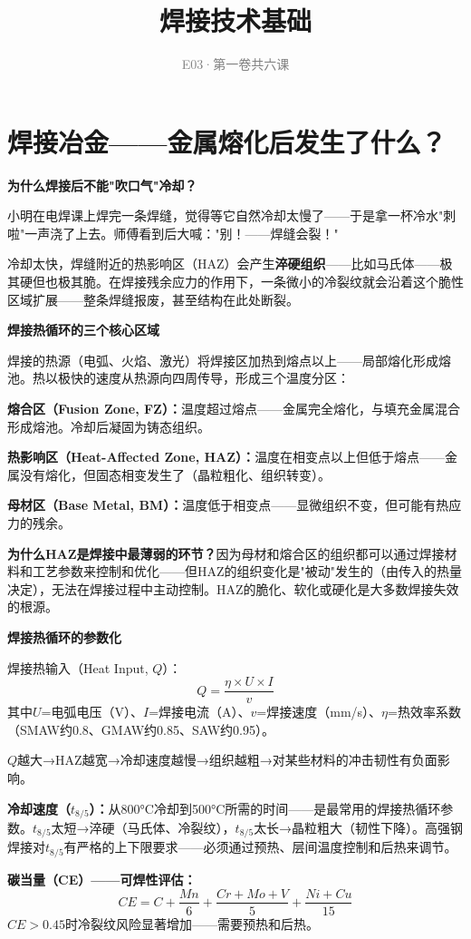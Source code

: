 \documentclass[a4paper,11pt]{ctexbook}
\title{\textcolor{themeblue}{\Huge\textbf{焊接技术基础}}}
\subtitle{\textcolor{gray}{E03·第一卷\quad 共六课}}
\date{}
\newenvironment{scenario}{\vspace{0.4cm}\noindent\begin{tcolorbox}[colback=scenario!5!white,colframe=scenario!70!black,title=\textcolor{scenario}{\textbf{情景引入}}]\vspace{0.1cm}}{\end{tcolorbox}\vspace{0.3cm}}
\newenvironment{qualitative}{\vspace{0.3cm}\noindent\begin{tcolorbox}[colback=themeblue!5!white,colframe=themeblue!60!black,title=\textcolor{themeblue}{\textbf{定性分析}}]\vspace{0.1cm}}{\end{tcolorbox}\vspace{0.3cm}}
\newenvironment{quantitative}{\vspace{0.3cm}\noindent\begin{tcolorbox}[colback=quant!5!white,colframe=quant!60!black,title=\textcolor{quant}{\textbf{定量分析}}]\vspace{0.1cm}}{\end{tcolorbox}\vspace{0.3cm}}
\begin{document}
\maketitle\thispagestyle{empty}\tableofcontents\newpage

\chapter{焊接冶金——金属熔化后发生了什么？}

\begin{scenario}
\textbf{为什么焊接后不能"吹口气"冷却？}

小明在电焊课上焊完一条焊缝，觉得等它自然冷却太慢了——于是拿一杯冷水"刺啦"一声浇了上去。师傅看到后大喊："别！——焊缝会裂！"

冷却太快，焊缝附近的热影响区（HAZ）会产生\textbf{淬硬组织}——比如马氏体——极其硬但也极其脆。在焊接残余应力的作用下，一条微小的冷裂纹就会沿着这个脆性区域扩展——整条焊缝报废，甚至结构在此处断裂。
\end{scenario}

\begin{qualitative}
\textbf{焊接热循环的三个核心区域}

焊接的热源（电弧、火焰、激光）将焊接区加热到熔点以上——局部熔化形成熔池。热以极快的速度从热源向四周传导，形成三个温度分区：

\textbf{熔合区（Fusion Zone, FZ）：}温度超过熔点——金属完全熔化，与填充金属混合形成熔池。冷却后凝固为铸态组织。

\textbf{热影响区（Heat-Affected Zone, HAZ）：}温度在相变点以上但低于熔点——金属没有熔化，但固态相变发生了（晶粒粗化、组织转变）。

\textbf{母材区（Base Metal, BM）：}温度低于相变点——显微组织不变，但可能有热应力的残余。

\textbf{为什么HAZ是焊接中最薄弱的环节？}因为母材和熔合区的组织都可以通过焊接材料和工艺参数来控制和优化——但HAZ的组织变化是"被动"发生的（由传入的热量决定），无法在焊接过程中主动控制。HAZ的脆化、软化或硬化是大多数焊接失效的根源。
\end{qualitative}

\begin{quantitative}
\textbf{焊接热循环的参数化}

焊接热输入（Heat Input, $Q$）：
\[
Q = \frac{\eta \times U \times I}{v}
\]
其中$U$=电弧电压（V）、$I$=焊接电流（A）、$v$=焊接速度（mm/s）、$\eta$=热效率系数（SMAW约0.8、GMAW约0.85、SAW约0.95）。

$Q$越大→HAZ越宽→冷却速度越慢→组织越粗→对某些材料的冲击韧性有负面影响。

\textbf{冷却速度（$t_{8/5}$）：}从800°C冷却到500°C所需的时间——是最常用的焊接热循环参数。$t_{8/5}$太短→淬硬（马氏体、冷裂纹），$t_{8/5}$太长→晶粒粗大（韧性下降）。高强钢焊接对$t_{8/5}$有严格的上下限要求——必须通过预热、层间温度控制和后热来调节。

\textbf{碳当量（CE）——可焊性评估：}
\[
CE = C + \frac{Mn}{6} + \frac{Cr + Mo + V}{5} + \frac{Ni + Cu}{15}
\]
$CE > 0.45$时冷裂纹风险显著增加——需要预热和后热。
\end{quantitative}
\end{document}
